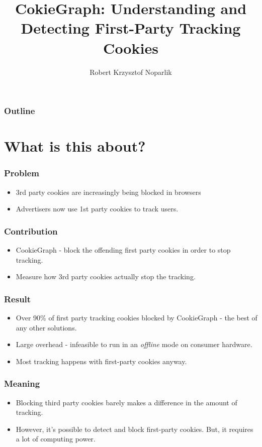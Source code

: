 \documentclass{beamer}
\title{CokieGraph:
Understanding and Detecting First-Party Tracking Cookies}
\author{Robert Krzysztof Noparlik}
\begin{document}
\begin{frame}
\titlepage
\end{frame}

\begin{frame}
\frametitle{Outline}
\tableofcontents
\end{frame}


\section{What is this about?}


\begin{frame}
\frametitle{Problem}
\begin{itemize}
\item 3rd party cookies are increasingly being blocked in browsers
\item Advertisers now use 1st party cookies to track users. 
\end{itemize}
\end{frame}


\begin{frame}
\frametitle{Contribution}

\begin{itemize}
\item CookieGraph - block the offending first party cookies in order to stop tracking.
\item Measure how 3rd party cookies actually stop the tracking.
\end{itemize}
\end{frame}

\begin{frame}
\frametitle{Result}

\begin{itemize}
\item Over 90\% of first party tracking cookies blocked by CookieGraph - the best of any other solutions.
\item Large overhead - infeasible to run in an \textit{offline} mode on consumer hardware.
\item Most tracking happens with first-party cookies anyway.
\end{itemize}
\end{frame}

\begin{frame}
\frametitle{Meaning}
\begin{itemize}
\item Blocking third party cookies barely makes a difference in the amount of tracking.
\item However, it's possible to detect and block first-party cookies. But, it requires a lot of computing power.
\end{itemize}
\end{frame}
\end{document}

